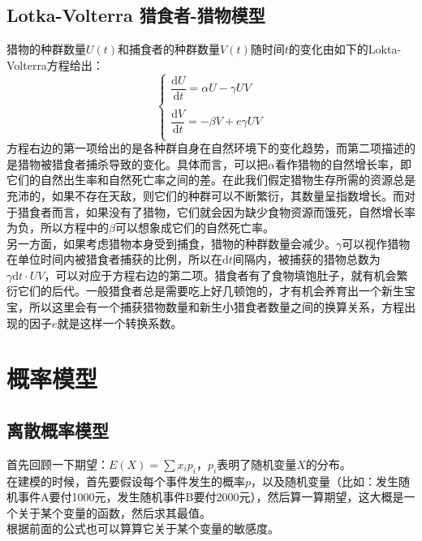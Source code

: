 \documentclass[11pt,a4paper]{article}
\begin{document}
\subsection{Lotka-Volterra 猎食者-猎物模型}
\indent\setlength{\parindent}{2em}猎物的种群数量$U(t)$和捕食者的种群数量$V(t)$随时间$t$的变化由如下的Lokta-Volterra方程给出：
\begin{equation*}
	\begin{cases}
	\dfrac{\mathrm{d}U}{\mathrm{d}t}=\alpha U-\gamma UV\\
	\\
	\dfrac{\mathrm{d}V}{\mathrm{d}t}=-\beta V+e\gamma UV\\
	\end{cases}
\end{equation*}
\indent\setlength{\parindent}{2em}方程右边的第一项给出的是各种群自身在自然环境下的变化趋势，而第二项描述的是猎物被猎食者捕杀导致的变化。具体而言，可以把$\alpha$看作猎物的自然增长率，即它们的自然出生率和自然死亡率之间的差。在此我们假定猎物生存所需的资源总是充沛的，如果不存在天敌，则它们的种群可以不断繁衍，其数量呈指数增长。而对于猎食者而言，如果没有了猎物，它们就会因为缺少食物资源而饿死，自然增长率为负，所以方程中的$\beta$可以想象成它们的自然死亡率。\\
\indent\setlength{\parindent}{2em}另一方面，如果考虑猎物本身受到捕食，猎物的种群数量会减少。$\gamma$可以视作猎物在单位时间内被猎食者捕获的比例，所以在$\mathrm{d}t$间隔内，被捕获的猎物总数为$\gamma \mathrm{d}t \cdot UV$，可以对应于方程右边的第二项。猎食者有了食物填饱肚子，就有机会繁衍它们的后代。一般猎食者总是需要吃上好几顿饱的，才有机会养育出一个新生宝宝，所以这里会有一个捕获猎物数量和新生小猎食者数量之间的换算关系，方程出现的因子$e$就是这样一个转换系数。\\


\section{概率模型}
\subsection{离散概率模型}
首先回顾一下期望：$E(X)=\sum x_i p_i$，$p_i$表明了随机变量$X$的分布。\\
在建模的时候，首先要假设每个事件发生的概率$p$，以及随机变量（比如：发生随机事件A要付1000元，发生随机事件B要付2000元），然后算一算期望，这大概是一个关于某个变量的函数，然后求其最值。\\
\indent\setlength{\parindent}{2em}根据前面的公式也可以算算它关于某个变量的敏感度。\\
\end{document}
